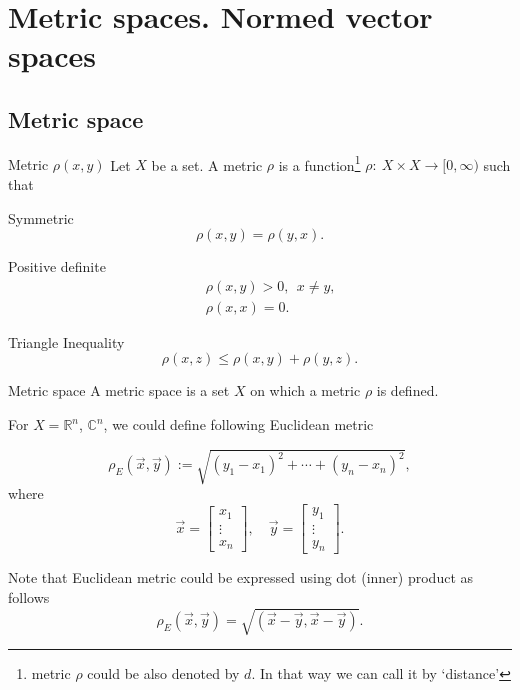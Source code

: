  \section{Metric spaces. Normed vector spaces}

\subsection*{Metric space}
\begin{definition}{Metric $\rho(x,y)$}{}
    Let $X$ be a set. A metric $\rho$ is a function\footnote{metric $\rho$ could be also denoted by $d$. In that way we can call it by `distance'} $\rho: \ X \times X \to [0, \infty)$ such that 
    \begin{enumerate*}
        \item Symmetric
        \[
            \rho(x,y) = \rho(y,x).  
        \]
        \item Positive definite
        \begin{eqnarray}
            &&\rho(x,y) > 0, \ \  x \neq y,\nonumber\\
            &&\rho(x,x) = 0.\nonumber
        \end{eqnarray}
        \item Triangle Inequality
        \[
            \rho(x, z) \leq \rho (x,y) + \rho(y,z).  
        \]
    \end{enumerate*}
\end{definition}

\begin{definition}{Metric space}{}
    A metric space is a set $X$ on which a metric $\rho$ is defined.
\end{definition}

\Ex For $X=\mathbb{R}^n$, $\mathbb{C}^n$, we could define following Euclidean metric

$$
    \rho_E(\vec{x},\vec{y}):=\sqrt{(y_1-x_1)^2+\cdots+(y_n-x_n)^2},
$$
where 
$$
    \vec{x}=
    \begin{bmatrix}
        x_1\\
        \vdots\\
        x_n
    \end{bmatrix},\quad
    \vec{y}=
    \begin{bmatrix}
        y_1\\
        \vdots\\
        y_n
    \end{bmatrix}.
$$

Note that Euclidean metric could be expressed using dot (inner) product as follows 
$$
    \rho_E(\vec{x},\vec{y})=\sqrt{(\vec{x}-\vec{y},\vec{x}-\vec{y})}.
$$

